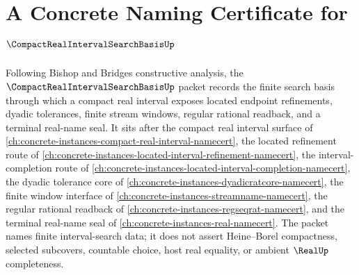\chapter{A Concrete Naming Certificate for $\CompactRealIntervalSearchBasisUp$}
\label{ch:concrete-instances-compact-real-interval-search-basis-namecert}

Following Bishop and Bridges constructive analysis, the $\CompactRealIntervalSearchBasisUp$ packet records the finite search basis through which a compact real interval exposes located endpoint refinements, dyadic tolerances, finite stream windows, regular rational readback, and a terminal real-name seal. It sits after the compact real interval surface of \autoref{ch:concrete-instances-compact-real-interval-namecert}, the located refinement route of \autoref{ch:concrete-instances-located-interval-refinement-namecert}, the interval-completion route of \autoref{ch:concrete-instances-located-interval-completion-namecert}, the dyadic tolerance core of \autoref{ch:concrete-instances-dyadicratcore-namecert}, the finite window interface of \autoref{ch:concrete-instances-streamname-namecert}, the regular rational readback of \autoref{ch:concrete-instances-regseqrat-namecert}, and the terminal real-name seal of \autoref{ch:concrete-instances-real-namecert}. The packet names finite interval-search data; it does not assert Heine--Borel compactness, selected subcovers, countable choice, host real equality, or ambient $\RealUp$ completeness.


